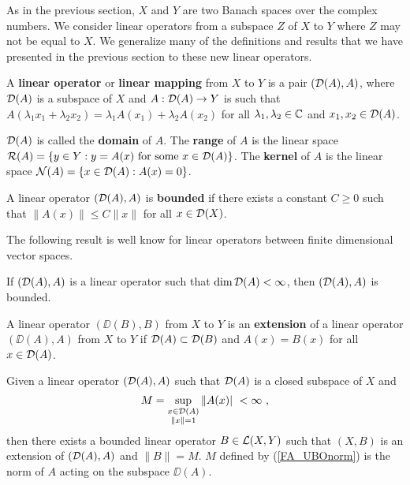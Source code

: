 As in the previous section, $X$ and $Y$ are two Banach spaces over the
complex numbers.  We consider linear operators from a subspace $Z$ of
$X$ to $Y$ where $Z$ may not be equal to $X$.  We generalize many
of the definitions and results that we have presented in the previous
section to these new linear operators.

\begin{defn}
A {\bfseries linear operator} or
{\bfseries linear mapping} from $X$
to $Y$ is a pair $(\mathcal{D}(A),A)$, where $\mathcal{D}(A)$ is a subspace of $X$
and $A:\mathcal{D}(A) \rightarrow Y$ is such that
$A(\lambda_1 x_1 + \lambda_2 x_2) = \lambda_1 A(x_1) + \lambda_2 A(x_2)$
for all $\lambda_1, \lambda_2 \in \mathbb{C}$ and $x_1, x_2 \in \mathcal{D}(A)$.

$\mathcal{D}(A)$ is called the {\bfseries domain}
of $A$.  The {\bfseries range} of $A$ is
the linear space
$\displaystyle \mathcal{R}(A) = \left\{ y \in Y : y = A(x) \ \text{for some}
\ x\in \mathcal{D}(A)\right\}$.
The {\bfseries kernel} of $A$ is the
linear space
$\displaystyle \mathcal{N}(A) = \left\{ x \in \mathcal{D}(A) : A(x) = 0 \right\}$.
\end{defn}

\begin{defn}
A linear operator $(\mathcal{D}(A),A)$ is
{\bfseries bounded} if there
exists a constant $C\geq 0$ such that $\|A(x)\| \leq C \|x\|$ for all
$x\in \mathcal{D}(X)$.
\end{defn}

The following result is well know for linear operators between finite
dimensional vector spaces.

\begin{prop}
If $(\mathcal{D}(A),A)$ is a linear operator such that $\dim \mathcal{D}(A) < \infty$,
then $(\mathcal{D}(A),A)$ is bounded.
\end{prop}

\begin{defn}
A linear operator $(\DD(B),B)$ from $X$ to $Y$ is an
{\bfseries extension} of a
linear operator $(\DD(A),A)$ from $X$ to $Y$ if $\mathcal{D}(A) \subset \mathcal{D}(B)$ and 
$A(x)=B(x)$ for all $x \in \mathcal{D}(A)$.
\end{defn}

\begin{theorem}
Given a linear operator $(\mathcal{D}(A),A)$ such that
$\mathcal{D}(A)$ is a closed subspace of $X$ and
\begin{equation} \label{FA_UBOnorm}
M = \sup_{\substack{x\in\DO(A)\\ \|x\|=1}} \|A(x)|\ < \infty \ ,
\end{equation}
then there exists a bounded linear operator $B \in \mathcal{L}(X,Y)$ such that
$(X,B)$ is an extension of $(\mathcal{D}(A),A)$ and $\|B\| = M$.
$M$ defined by (\ref{FA_UBOnorm}) is the norm of $A$ acting on the
subspace $\DD(A)$.
\end{theorem}

